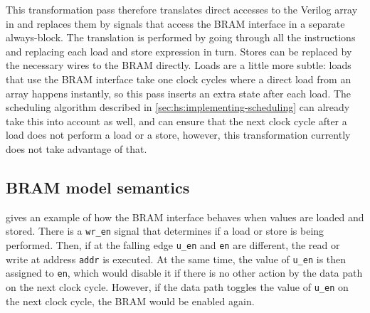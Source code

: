 
This transformation pass therefore translates direct accesses to the Verilog
array in \htl{} and replaces them by signals that access the \gls{BRAM}
interface in a separate always-block. The translation is performed by going
through all the instructions and replacing each load and store expression in
turn.  Stores can be replaced by the necessary wires to the \gls{BRAM}
directly. Loads are a little more subtle: loads that use the \gls{BRAM}
interface take one clock cycles where a direct load from an array happens instantly, so this pass inserts an extra state after each load.  The scheduling
algorithm described in \cref{sec:hs:implementing-scheduling} can already take
this into account as well, and can ensure that the next clock cycle after a load
does not perform a load or a store, however, this transformation currently does
not take advantage of that.

\subsection{BRAM model semantics}%
\label{sec:hg:bram-model-semantics}

 gives an example of how the \gls{BRAM} interface
behaves when values are loaded and stored.  There is a \texttt{wr\_en} signal
that determines if a load or store is being performed.  Then, if at the falling
edge \texttt{u\_en} and \texttt{en} are different, the read or write at address
\texttt{addr} is executed.  At the same time, the value of \texttt{u\_en} is
then assigned to \texttt{en}, which would disable it if there is no other action
by the data path on the next clock cycle.  However, if the data path toggles the
value of \texttt{u\_en} on the next clock cycle, the \gls{BRAM} would be enabled
again.

